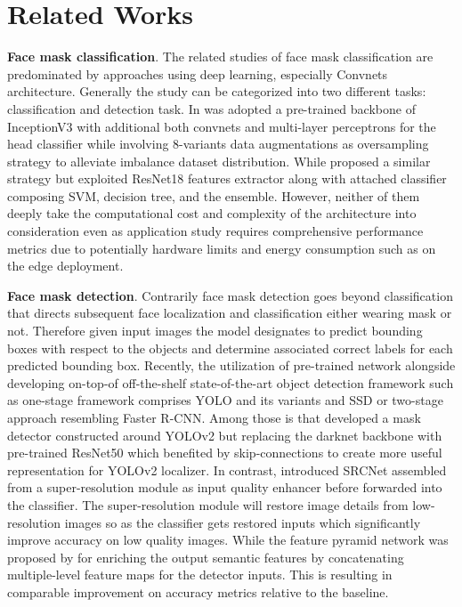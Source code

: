 \documentclass[conference]{IEEEtran}
\begin{document}
\section{Related Works}
\textbf{Face mask classification}. The related studies of face mask classification are predominated by approaches using deep learning, especially Convnets architecture. Generally the study can be categorized into two different tasks: classification \cite{Loey2020AHD, Chowdary2020FaceMD, Sanjaya2020} and  detection task\cite{Jiang2020, Qin2020, Loey2020FightingAC, Chavda2020, Suresh2021, Roy2020}. In \cite{Chowdary2020FaceMD} was adopted a pre-trained backbone of InceptionV3 with additional both convnets  and multi-layer perceptrons for the head classifier while involving 8-variants data augmentations as oversampling strategy to alleviate imbalance dataset distribution. While \cite{Loey2020AHD} proposed a similar strategy but exploited ResNet18 features extractor along with attached classifier composing SVM, decision tree, and the ensemble. However, neither of them deeply take the computational cost and complexity of the architecture into consideration even as application study requires comprehensive performance metrics due to potentially hardware limits and energy consumption such as on the edge deployment. 

\textbf{Face mask detection}. Contrarily face mask detection goes beyond classification that directs subsequent face localization and classification either wearing mask or not. Therefore given input images the model designates to predict bounding boxes with respect to the objects and determine associated correct labels for each predicted bounding box. Recently, the utilization of pre-trained network alongside developing on-top-of off-the-shelf state-of-the-art object detection framework such as  one-stage framework comprises YOLO\cite{Redmon2016YouOL} and its variants \cite{Redmon2018YOLOv3AI} and SSD\cite{Liu2016SSDSS} or two-stage approach resembling Faster R-CNN\cite{Ren2015FasterRT}. Among those is \cite{Loey2020FightingAC} that developed a mask detector constructed around YOLOv2 but replacing the darknet backbone with pre-trained ResNet50 which benefited by skip-connections to create more useful representation for YOLOv2 localizer. In contrast, \cite{Qin2020} introduced SRCNet assembled from a super-resolution module as input quality enhancer before forwarded into the classifier. The super-resolution module will restore image details from low-resolution images so as the classifier gets restored inputs which significantly improve accuracy on low quality images. While the feature pyramid network was proposed by \cite{Jiang2020} for enriching the output semantic features by concatenating multiple-level feature maps for the detector inputs. This is resulting in comparable improvement on accuracy metrics relative to the baseline.
\end{document}
